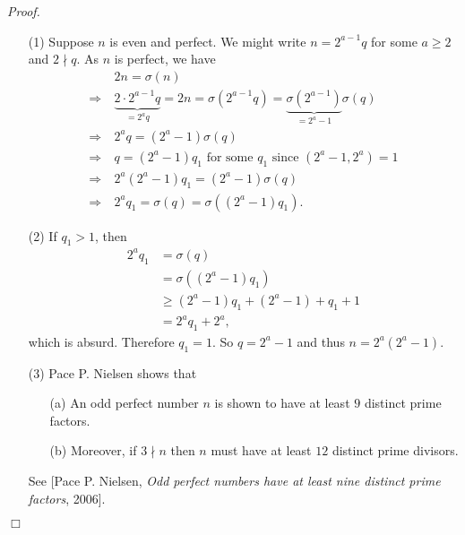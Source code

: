 \documentclass{article}
\begin{document}
\emph{Proof.}
\begin{enumerate}
\item[(1)]
  Suppose $n$ is even and perfect.
  We might write $n = 2^{a-1}q$ for some $a \geq 2$ and $2 \nmid q$.
  As $n$ is perfect, we have
  \begin{align*}
    &\:
    2n = \sigma(n) \\
    \Longrightarrow &\:
    \underbrace{2 \cdot 2^{a-1}q}_{= 2^a q}
    = 2n
    = \sigma(2^{a-1}q)
    = \underbrace{\sigma(2^{a-1})}_{= 2^{a}-1} \sigma(q) \\
    \Longrightarrow &\:
    2^{a}q = (2^{a} - 1) \sigma(q) \\
    \Longrightarrow &\:
    \text{$q = (2^a - 1) q_1$ for some $q_1$ since $(2^a-1, 2^a) = 1$} \\
    \Longrightarrow &\:
    2^{a} (2^a - 1) q_1 = (2^{a} - 1) \sigma(q) \\
    \Longrightarrow &\:
    2^{a} q_1 = \sigma(q) = \sigma((2^a - 1) q_1).
  \end{align*}

\item[(2)]
  If $q_1 > 1$, then
  \begin{align*}
    2^{a} q_1
    &= \sigma(q) \\
    &= \sigma((2^a - 1) q_1) \\
    &\geq (2^a - 1) q_1 + (2^a - 1) + q_1 + 1 \\
    &= 2^{a} q_1 + 2^a,
  \end{align*}
  which is absurd.
  Therefore $q_1 = 1$. So $q = 2^a - 1$ and thus $n = 2^a(2^a-1)$.

\item[(3)]
  Pace P. Nielsen shows that
  \begin{enumerate}
  \item[(a)]
    An odd perfect number $n$ is shown to have at least $9$ distinct prime factors.

  \item[(b)]
    Moreover, if $3 \nmid n$ then $n$ must have at least $12$ distinct prime divisors.
  \end{enumerate}
  See [Pace P. Nielsen, \emph{Odd perfect numbers have at least nine distinct prime factors}, 2006].
\end{enumerate}
$\Box$ \\\\



\end{document}
